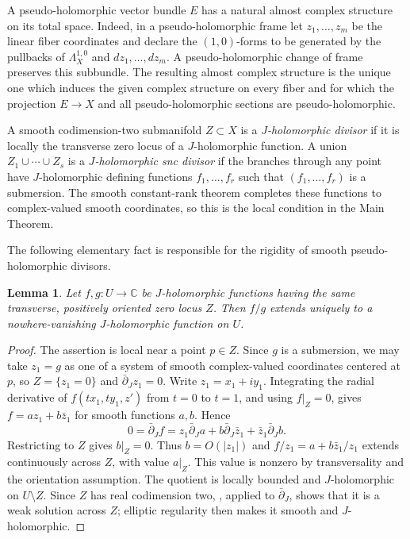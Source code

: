 \documentclass[11pt]{amsart}
\numberwithin{equation}{section}
\theoremstyle{plain}
\newtheorem{lemma}[theorem]{Lemma}
\theoremstyle{definition}
\newcommand{\CC}{\mathbb{C}}
\newcommand{\delbar}{\bar\partial}
\begin{document}
A pseudo-holomorphic vector bundle $E$ has a natural almost complex structure
on its total space. Indeed, in a pseudo-holomorphic frame let
$z_1,\ldots,z_m$ be the linear fiber coordinates and declare the
$(1,0)$-forms to be generated by the pullbacks of $\Lambda_X^{1,0}$ and
$dz_1,\ldots,dz_m$. A pseudo-holomorphic change of frame preserves this
subbundle. The resulting almost complex structure is the unique one which
induces the given complex structure on every fiber and for which the
projection $E\to X$ and all pseudo-holomorphic sections are
pseudo-holomorphic.

A smooth codimension-two submanifold $Z\subset X$ is a
\emph{$J$-holomorphic divisor} if it is locally the transverse zero locus of
a $J$-holomorphic function. A union $Z_1\cup\cdots\cup Z_s$ is a
\emph{$J$-holomorphic snc divisor} if the branches through any point have
$J$-holomorphic defining functions $f_1,\ldots,f_r$ such that
$(f_1,\ldots,f_r)$ is a submersion. The smooth constant-rank theorem
completes these functions to complex-valued smooth coordinates, so this is
the local condition in the Main Theorem.

The following elementary fact is responsible for the rigidity of smooth
pseudo-holomorphic divisors.

\begin{lemma}
\label{Lem: f/g is J-hol for smooth D}
Let $f,g:U\to\CC$ be $J$-holomorphic functions having the same transverse,
positively oriented zero locus $Z$. Then $f/g$ extends uniquely to a
nowhere-vanishing $J$-holomorphic function on $U$.
\end{lemma}

\begin{proof}
The assertion is local near a point $p\in Z$. Since $g$ is a submersion, we may
take $z_1=g$ as one of a system of smooth complex-valued coordinates centered at
$p$, so $Z=\{z_1=0\}$ and $\delbar_Jz_1=0$. Write $z_1=x_1+iy_1$. Integrating
the radial derivative of $f(tx_1,ty_1,z')$ from $t=0$ to $t=1$, and using
$f|_Z=0$, gives $f=az_1+b\bar z_1$ for smooth functions $a,b$. Hence
\[
0=\delbar_Jf
=z_1\delbar_Ja+b\delbar_J\bar z_1+\bar z_1\delbar_Jb.
\]
Restricting to $Z$ gives $b|_Z=0$. Thus $b=O(|z_1|)$ and $f/z_1=a+b\bar z_1/z_1$
extends continuously across $Z$, with value $a|_Z$. This value is nonzero by
transversality and the orientation assumption. The quotient is locally bounded
and $J$-holomorphic on $U\setminus Z$. Since $Z$ has real codimension two,
\cite[Thm.\,4.1(b)]{HarveyPolking}, applied to $\delbar_J$, shows that it is a
weak solution across $Z$; elliptic regularity then makes it smooth and
$J$-holomorphic.
\end{proof}
\end{document}
